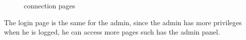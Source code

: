 \documentclass{article}
\begin{document}
\begin{figure}[h!]
    \centering
    \qquad
    \caption{connection pages}%
    \label{fig:mineral}%
\end{figure}

The login page is the same for the admin, since the admin has more privileges when he is logged, he can access more pages such has the admin panel.
\end{document}
